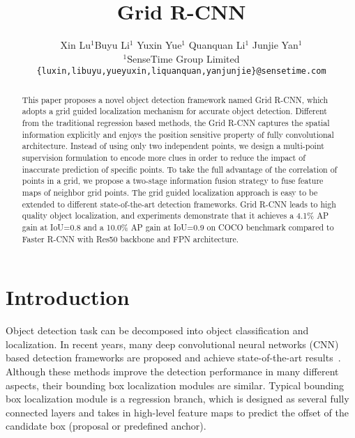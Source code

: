 \documentclass[10pt,twocolumn,letterpaper]{article}
\begin{document}
\title{Grid R-CNN}

\author{Xin Lu$^1$\quad Buyu Li$^1$ \quad Yuxin Yue$^1$ \quad Quanquan Li$^1$ \quad Junjie Yan$^1$ \\
$^1$SenseTime Group Limited\\
{\tt\small \{luxin,libuyu,yueyuxin,liquanquan,yanjunjie\}@sensetime.com} \\
}
\maketitle

\begin{abstract}
This paper proposes a novel object detection framework named Grid R-CNN, which adopts a grid guided localization mechanism for accurate object detection. Different from the traditional regression based methods, the Grid R-CNN captures the spatial information explicitly and enjoys the position sensitive property of fully convolutional architecture. Instead of using only two independent points, we design a multi-point supervision formulation to encode more clues in order to reduce the impact of inaccurate prediction of specific points. To take the full advantage of the correlation of points in a grid, we propose a two-stage information fusion strategy to fuse feature maps of neighbor grid points. The grid guided localization approach is easy to be extended to different state-of-the-art detection frameworks. Grid R-CNN leads to high quality object localization, and experiments demonstrate that it achieves a 4.1\% AP gain at IoU=0.8 and a 10.0\% AP gain at IoU=0.9 on COCO benchmark compared to Faster R-CNN with Res50 backbone and FPN architecture.


\end{abstract}

\section{Introduction}
\label{sec:intro}

Object detection task can be decomposed into object classification and localization. In recent years, many deep convolutional neural networks (CNN) based detection frameworks are proposed and achieve state-of-the-art results~\cite{girshick2014rich,girshick2015fast,ren2015faster,lin2017feature,he2017mask,cai2017cascade}. Although these methods improve the detection performance in many different aspects, their bounding box localization modules are similar. Typical bounding box localization module is a regression branch, which is designed as several fully connected layers and takes in high-level feature maps to predict the offset of the candidate box (proposal or predefined anchor). 
\end{document}
